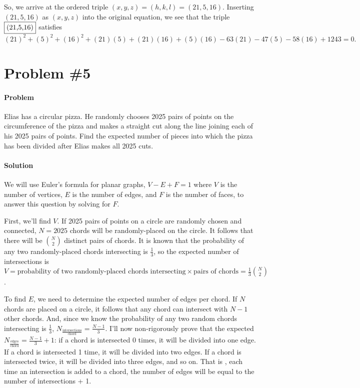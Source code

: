 \documentclass[10pt]{article}
\theoremstyle{plain}
\theoremstyle{definition}
\theoremstyle{remark}
\begin{document}
So, we arrive at the ordered triple \((x,y,z)=(h,k,l)=(21,5,16)\). Inserting \((21,5,16)\) as \((x,y,z)\) into the original equation, we see that the triple \(\fbox{(21,5,16)}\) satisfies \[(21)^2+(5)^2+(16)^2+(21)(5)+(21)(16)+(5)(16)-63(21)-47(5)-58(16)+1243=0.\]

\section{Problem \#5}

\paragraph{Problem} Elias has a circular pizza. He randomly chooses 2025 pairs of points on the circumference of the pizza and makes a straight cut along the line joining each of his 2025 pairs of points. Find the expected number of pieces into which the pizza has been divided after Elias makes all 2025 cuts.

\paragraph{Solution} We will use Euler's formula for planar graphs, \(V-E+F=1\) where \(V\) is the number of vertices, \(E\) is the number of edges, and \(F\) is the number of faces, to answer this question by solving for \(F\).

First, we'll find \(V\). If 2025 pairs of points on a circle are randomly chosen and connected, \(N=2025\) chords will be randomly-placed on the circle. It follows that there will be \(\binom{N}{2}\) distinct pairs of chords. It is known that the probability of any two randomly-placed chords intersecting is \(\frac{1}{3}\), so the expected number of intersections is \(V=\text{probability of two randomly-placed chords intersecting} \times \text{pairs of chords}=\frac{1}{3}\binom{N}{2}\).

To find \(E\), we need to determine the expected number of edges per chord. If \(N\) chords are placed on a circle, it follows that any chord can intersect with \(N-1\) other chords. And, since we know the probability of any two random chords intersecting is \(\frac{1}{3}\), \(N_{\frac{\text{intersections}}{\text{chord}}}=\frac{N-1}{3}\). I'll now non-rigorously prove that the expected \(N_{\frac{\text{edges}}{\text{chord}}}=\frac{N-1}{3}+1\): if a chord is intersected 0 times, it will be divided into one edge. If a chord is intersected 1 time, it will be divided into two edges. If a chord is intersected twice, it will be divided into three edges, and so on. That is , each time an intersection is added to a chord, the number of edges will be equal to the number of intersections + 1.
\end{document}
